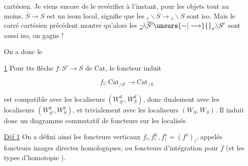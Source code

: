 
cartésien. Je viens encore de le revérifier à l'instant, pour les objets tout au moins.   $\overline S\longrightarrow S$ est un isom local, signifie que les $ {}_{\bar s}\!\backslash\overline S\longrightarrow {}_{s}\!\backslash S$ sont iso. Mais le carré cartésien précédent montre qu'alors les $ {}_{\overline{s'}}\!\backslash\overline{S'}\unsure{\mathord{-}|\longrightarrow} {}_{s'}\!\backslash S'$ sont aussi iso, on gagne !

On a donc le

\uline{  1} Pour tte flèche $f:S'\longrightarrow S$ de $\mathrm{Cat}$, le foncteur induit

\[
f_!:\mathrm{Cat}_{/S'}\longrightarrow\mathrm{Cat}_{/S}
\]

est compatible avec les localiseurs $(W^d_{S'},W^d_S)$, donc dualement avec les localiseurs $(W^g_{S'},W^g_S)$, et trivialement avec les localiseurs $(W_S,W_S)$. Il induit donc un diagramme commutatif de foncteurs sur les localisés


\uline{Déf 1} On a défini ainsi les foncteurs verticaux $f_!,f_!^{\mathrm{lc}},f_!^{\mathrm o}=(f^{\mathrm o})_!$, appelés foncteurs images directes homologiques, ou foncteurs d'intégration pour $f$ (et les types d'homotopie ).
